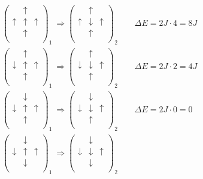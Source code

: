 \documentclass[%
 reprint,
nofootinbib,
aps,
]{revtex4-1}
\begin{document}
\begin{align*}
    &\begin{pmatrix} &\uparrow&\\ \uparrow&\uparrow&\uparrow\\ &\uparrow&\\\end{pmatrix}_1 \ \Longrightarrow
    \begin{pmatrix} &\uparrow&\\ \uparrow&\downarrow&\uparrow\\ &\uparrow&\\\end{pmatrix}_2 \qquad
    \Delta E = 2J\cdot4 = 8J& \\
    &\begin{pmatrix} &\uparrow&\\ \downarrow&\uparrow&\uparrow\\ &\uparrow&\\\end{pmatrix}_1 \ \Longrightarrow
    \begin{pmatrix} &\uparrow&\\ \downarrow&\downarrow&\uparrow\\ &\uparrow&\\\end{pmatrix}_2 \qquad
    \Delta E = 2J\cdot2 = 4J& \\
    &\begin{pmatrix} &\downarrow&\\ \downarrow&\uparrow&\uparrow\\ &\uparrow&\\\end{pmatrix}_1 \ \Longrightarrow
    \begin{pmatrix} &\downarrow&\\ \downarrow&\downarrow&\uparrow\\ &\uparrow&\\\end{pmatrix}_2 \qquad
    \Delta E = 2J\cdot0 = 0& \\
    &\begin{pmatrix} &\downarrow&\\ \downarrow&\uparrow&\uparrow\\ &\downarrow&\\\end{pmatrix}_1 \ \Longrightarrow
    \begin{pmatrix} &\downarrow&\\ \downarrow&\downarrow&\uparrow\\ &\downarrow&\\\end{pmatrix}_2 \qquad

\end{align*}
\end{document}
